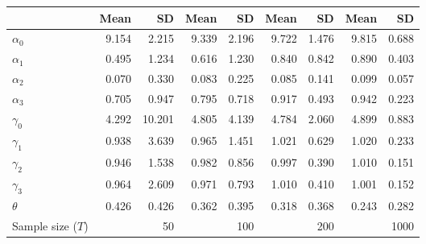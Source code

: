 
\begin{tabular}[t]{lrrrrrrrr}
\toprule
  & Mean & SD & Mean  & SD  & Mean   & SD   & Mean    & SD   \\
\midrule
$\alpha_{0}$ & 9.154 & 2.215 & 9.339 & 2.196 & 9.722 & 1.476 & 9.815 & 0.688\\
$\alpha_{1}$ & 0.495 & 1.234 & 0.616 & 1.230 & 0.840 & 0.842 & 0.890 & 0.403\\
$\alpha_{2}$ & 0.070 & 0.330 & 0.083 & 0.225 & 0.085 & 0.141 & 0.099 & 0.057\\
$\alpha_{3}$ & 0.705 & 0.947 & 0.795 & 0.718 & 0.917 & 0.493 & 0.942 & 0.223\\
$\gamma_{0}$ & 4.292 & 10.201 & 4.805 & 4.139 & 4.784 & 2.060 & 4.899 & 0.883\\
$\gamma_{1}$ & 0.938 & 3.639 & 0.965 & 1.451 & 1.021 & 0.629 & 1.020 & 0.233\\
$\gamma_{2}$ & 0.946 & 1.538 & 0.982 & 0.856 & 0.997 & 0.390 & 1.010 & 0.151\\
$\gamma_{3}$ & 0.964 & 2.609 & 0.971 & 0.793 & 1.010 & 0.410 & 1.001 & 0.152\\
$\theta$ & 0.426 & 0.426 & 0.362 & 0.395 & 0.318 & 0.368 & 0.243 & 0.282\\
Sample size ($T$) &  & 50 &  & 100 &  & 200 &  & 1000\\
\bottomrule
\end{tabular}
